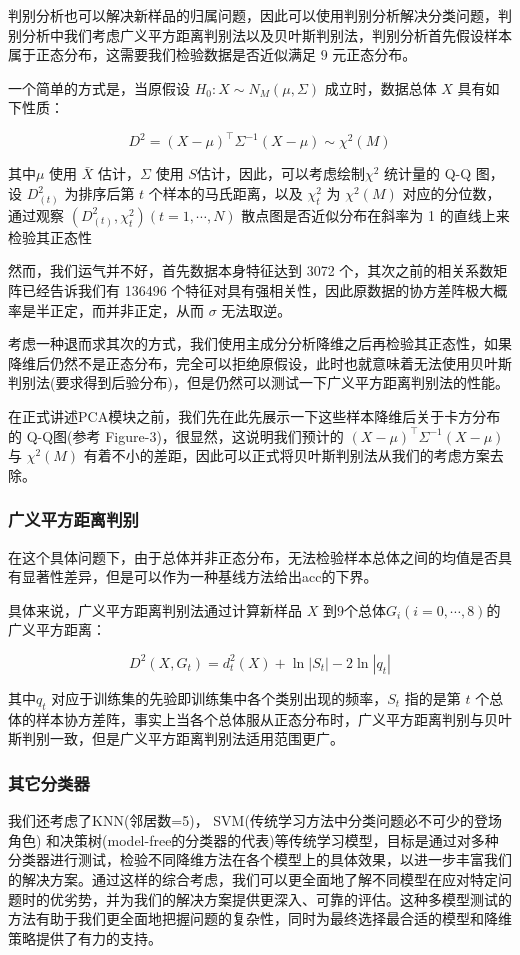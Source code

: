 \documentclass[fleqn]{Paquetes/RevDigMatEduInt}
\begin{document}
判别分析也可以解决新样品的归属问题，因此可以使用判别分析解决分类问题，判别分析中我们考虑广义平方距离判别法以及贝叶斯判别法，判别分析首先假设样本属于正态分布，这需要我们检验数据是否近似满足 $9$ 元正态分布。


一个简单的方式\cite{2}是，当原假设 $H_0:X\sim N_M(\mu,\Sigma)$ 成立时，数据总体 $X$ 具有如下性质：

\begin{lema}
	$$D^2 = (X - \mu)^\top \Sigma^{-1} (X - \mu) \sim \chi^2(M)$$
\end{lema}

其中$\mu$ 使用 $\bar{X}$ 估计，$\Sigma$ 使用 $S $估计，因此，可以考虑绘制$\chi^2$ 统计量的 Q-Q 图，设 $D_{(t)}^2$ 为排序后第 $t$ 个样本的马氏距离，以及 $\chi_t^2$ 为 $\chi^2(M)$ 对应的分位数，通过观察 $(D_{(t)}^2,\chi_t^2)(t = 1,\cdots,N)$ 散点图是否近似分布在斜率为 1 的直线上来检验其正态性

然而，我们运气并不好，首先数据本身特征达到 3072 个，其次之前的相关系数矩阵已经告诉我们有 136496 个特征对具有强相关性，因此原数据的协方差阵极大概率是半正定，而并非正定，从而 $\sigma$ 无法取逆。

考虑一种退而求其次的方式，我们使用主成分分析降维之后再检验其正态性，如果降维后仍然不是正态分布，完全可以拒绝原假设，此时也就意味着无法使用贝叶斯判别法(要求得到后验分布)，但是仍然可以测试一下广义平方距离判别法的性能。

在正式讲述PCA模块之前，我们先在此先展示一下这些样本降维后关于卡方分布的 Q-Q图(参考 Figure-3)，很显然，这说明我们预计的 $ (X - \mu)^\top \Sigma^{-1} (X - \mu)$ 与 $\chi^2(M)$ 有着不小的差距，因此可以正式将贝叶斯判别法从我们的考虑方案去除。

\subsubsection{广义平方距离判别}
在这个具体问题下，由于总体并非正态分布，无法检验样本总体之间的均值是否具有显著性差异，但是可以作为一种基线方法给出acc的下界。

具体来说，广义平方距离判别法通过计算新样品 $X$ 到9个总体$G_i(i=0,\cdots,8)$的广义平方距离：



$$
D^2(X,G_t) = d_t^2(X) + \ln |S_t| - 2\ln | q_t| 
$$

其中$q_t$ 对应于训练集的先验即训练集中各个类别出现的频率，$S_t$ 指的是第 $t$ 个总体的样本协方差阵，事实上当各个总体服从正态分布时，广义平方距离判别与贝叶斯判别一致，但是广义平方距离判别法适用范围更广。
 
\subsubsection{其它分类器}
我们还考虑了KNN(邻居数=5)， SVM(传统学习方法中分类问题必不可少的登场角色)\cite{4} 和决策树(model-free的分类器的代表)等传统学习模型，目标是通过对多种分类器进行测试，检验不同降维方法在各个模型上的具体效果，以进一步丰富我们的解决方案。通过这样的综合考虑，我们可以更全面地了解不同模型在应对特定问题时的优劣势，并为我们的解决方案提供更深入、可靠的评估。这种多模型测试的方法有助于我们更全面地把握问题的复杂性，同时为最终选择最合适的模型和降维策略提供了有力的支持。
\end{document}
